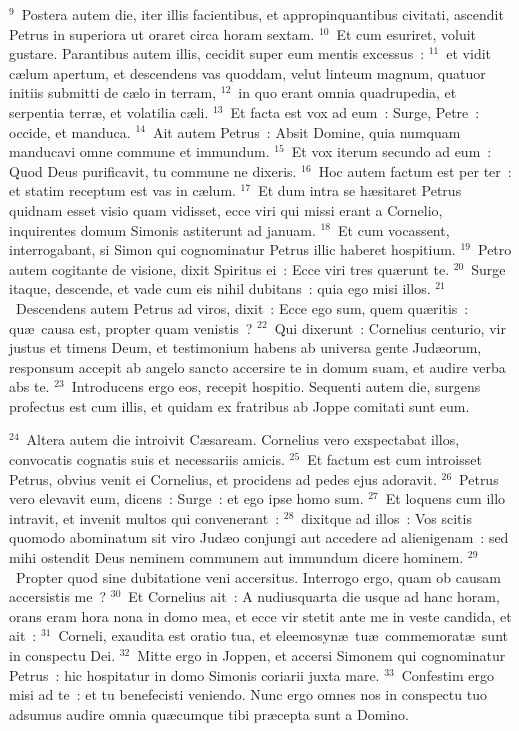 ${}^{9}$~Postera autem die, iter illis facientibus, et appropinquantibus civitati, ascendit Petrus in superiora ut oraret circa horam sextam.
${}^{10}$~Et cum esuriret, voluit gustare. Parantibus autem illis, cecidit super eum mentis excessus~:
${}^{11}$~et vidit c\ae lum apertum, et descendens vas quoddam, velut linteum magnum, quatuor initiis submitti de c\ae lo in terram,
${}^{12}$~in quo erant omnia quadrupedia, et serpentia terr\ae , et volatilia c\ae li.
${}^{13}$~Et facta est vox ad eum~: Surge, Petre~: occide, et manduca.
${}^{14}$~Ait autem Petrus~: Absit Domine, quia numquam manducavi omne commune et immundum.
${}^{15}$~Et vox iterum secundo ad eum~: Quod Deus purificavit, tu commune ne dixeris.
${}^{16}$~Hoc autem factum est per ter~: et statim receptum est vas in c\ae lum.
${}^{17}$~Et dum intra se h\ae sitaret Petrus quidnam esset visio quam vidisset, ecce viri qui missi erant a Cornelio, inquirentes domum Simonis astiterunt ad januam.
${}^{18}$~Et cum vocassent, interrogabant, si Simon qui cognominatur Petrus illic haberet hospitium.
${}^{19}$~Petro autem cogitante de visione, dixit Spiritus ei~: Ecce viri tres qu\ae runt te.
${}^{20}$~Surge itaque, descende, et vade cum eis nihil dubitans~: quia ego misi illos.
${}^{21}$~Descendens autem Petrus ad viros, dixit~: Ecce ego sum, quem qu\ae ritis~: qu\ae\ causa est, propter quam venistis~?
${}^{22}$~Qui dixerunt~: Cornelius centurio, vir justus et timens Deum, et testimonium habens ab universa gente Jud\ae orum, responsum accepit ab angelo sancto accersire te in domum suam, et audire verba abs te.
${}^{23}$~Introducens ergo eos, recepit hospitio. Sequenti autem die, surgens profectus est cum illis, et quidam ex fratribus ab Joppe comitati sunt eum.


${}^{24}$~Altera autem die introivit C\ae saream. Cornelius vero exspectabat illos, convocatis cognatis suis et necessariis amicis.
${}^{25}$~Et factum est cum introisset Petrus, obvius venit ei Cornelius, et procidens ad pedes ejus adoravit.
${}^{26}$~Petrus vero elevavit eum, dicens~: Surge~: et ego ipse homo sum.
${}^{27}$~Et loquens cum illo intravit, et invenit multos qui convenerant~:
${}^{28}$~dixitque ad illos~: Vos scitis quomodo abominatum sit viro Jud\ae o conjungi aut accedere ad alienigenam~: sed mihi ostendit Deus neminem communem aut immundum dicere hominem.
${}^{29}$~Propter quod sine dubitatione veni accersitus. Interrogo ergo, quam ob causam accersistis me~?
${}^{30}$~Et Cornelius ait~: A nudiusquarta die usque ad hanc horam, orans eram hora nona in domo mea, et ecce vir stetit ante me in veste candida, et ait~:
${}^{31}$~Corneli, exaudita est oratio tua, et eleemosyn\ae\ tu\ae\ commemorat\ae\ sunt in conspectu Dei.
${}^{32}$~Mitte ergo in Joppen, et accersi Simonem qui cognominatur Petrus~: hic hospitatur in domo Simonis coriarii juxta mare.
${}^{33}$~Confestim ergo misi ad te~: et tu benefecisti veniendo. Nunc ergo omnes nos in conspectu tuo adsumus audire omnia qu\ae cumque tibi pr\ae cepta sunt a Domino.


